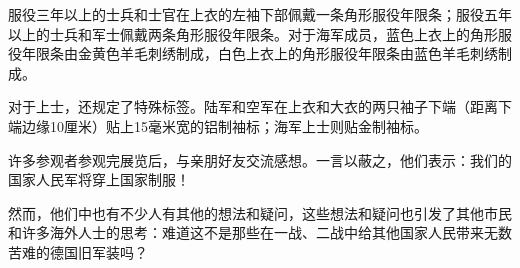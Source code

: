 服役三年以上的士兵和士官在上衣的左袖下部佩戴一条角形服役年限条；服役五年以上的士兵和军士佩戴两条角形服役年限条。对于海军成员，蓝色上衣上的角形服役年限条由金黄色羊毛刺绣制成，白色上衣上的角形服役年限条由蓝色羊毛刺绣制成。

对于上士，还规定了特殊标签。陆军和空军在上衣和大衣的两只袖子下端（距离下端边缘10厘米）贴上15毫米宽的铝制袖标；海军上士则贴金制袖标。

许多参观者参观完展览后，与亲朋好友交流感想。一言以蔽之，他们表示：我们的国家人民军将穿上国家制服！

然而，他们中也有不少人有其他的想法和疑问，这些想法和疑问也引发了其他市民和许多海外人士的思考：难道这不是那些在一战、二战中给其他国家人民带来无数苦难的德国旧军装吗？
